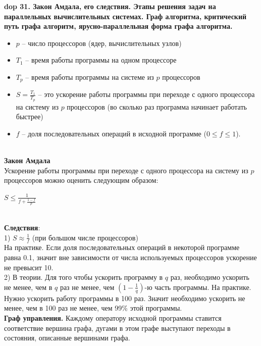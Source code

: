 \textbf{\LARGE dop 31. Закон Амдала, его следствия. Этапы решения задач на параллельных вычислительных системах. Граф алгоритма, критический путь графа алгоритм, ярусно-параллельная форма графа алгоритма.}\\

\begin{itemize}
    \item $p$ – число процессоров (ядер, вычислительных узлов)
    \item $T_{1}$ – время работы программы на одном процессоре
    \item $T_{p}$ – время работы программы на системе из $p$ процессоров
    \item $S = \frac{T_{1}}{T_{p}}$ – это ускорение работы программы при переходе с одного процессора на систему из $p$ процессоров (во сколько раз
программа начинает работать быстрее)
    \item $f$ – доля последовательных операций в исходной программе ($0 \leq f \leq 1$).
\end{itemize}\\

\textbf{Закон Амдала}\\
Ускорение работы программы при переходе с одного процессора на систему из $p$ процессоров можно оценить следующим образом:
\begin{center}
$S \leq \frac{1}{f + \frac{1 - f}{p}}$
\end{center}\\

\textbf{Следствия}:\\
1) $S \approx \frac{1}{f}$ (при большом числе процессоров)\\
На практике. Если доля последовательных операций в некоторой программе равна 0.1, значит вне зависимости от числа используемых процессоров ускорение не превысит 10.\\

2) В теории. Для того чтобы ускорить программу в $q$ раз, необходимо ускорить не менее, чем в $q$ раз не менее, чем $(1-\frac{1}{q})$-ю часть программы.
На практике. Нужно ускорить работу программы в 100 раз. Значит необходимо ускорить не менее, чем в 100 раз не менее, чем 99\% этой программы.\\

\textbf{Граф управления.} Каждому оператору исходной программы ставится соответствие вершина графа, дугами в этом графе выступают переходы в состояния, описанные вершинами графа.\\

